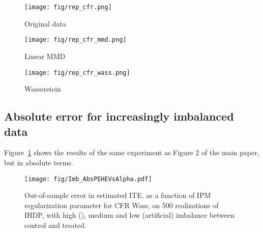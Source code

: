 \documentclass{article}
\begin{document}
\begin{figure*}[]
  \centering
  \begin{subfigure}[b]{0.3\textwidth}
    \centering
    \texttt{[image: fig/rep\_cfr.png]}
    \caption{Original data}
  \end{subfigure}
  \begin{subfigure}[b]{0.3\textwidth}
    \centering
    \texttt{[image: fig/rep\_cfr\_mmd.png]}
    \caption{Linear MMD}
  \end{subfigure}
  \begin{subfigure}[b]{0.3\textwidth}
    \centering
    \texttt{[image: fig/rep\_cfr\_wass.png]}
    \caption{Wasserstein}
  \end{subfigure}
  \caption{\label{fig:reps}t-SNE visualizations of the balanced representations of IHDP learned by our algorithms CFR, CFR MMD and CFR Wass. We note that the nearest-neighbor like quality of the Wasserstein distance results in a strip-like representation, whereas the linear MMD results in a ball-like shape in regions where overlap is small.}
\end{figure*}

\subsection{Absolute error for increasingly imbalanced data}
Figure~\ref{fig:ihdp_abs_imb} shows the results of the same experiment as Figure 2 of the main paper, but in absolute terms.
\begin{figure}[t]
  \centering
  \texttt{[image: fig/Imb\_AbsPEHEVsAlpha.pdf]}\vspace{-1em}
  \caption{\label{fig:ihdp_abs_imb}Out-of-sample error in estimated ITE, as a function of IPM regularization parameter for CFR Wass, on 500 realizations of IHDP, with high (), medium and low (artificial) imbalance between control and treated. }
  \vspace{-1em}
\end{figure}



 
\end{document}
